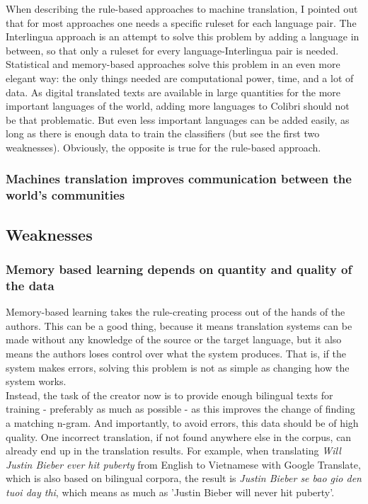 \documentclass[12pt]{article}
\begin{document}
When describing the rule-based approaches to machine translation, I pointed out that for most approaches one needs a specific ruleset for each language pair. The Interlingua approach is an attempt to solve this problem by adding a language in between, so that only a ruleset for every language-Interlingua pair is needed. Statistical and memory-based approaches solve this problem in an even more elegant way: the only things needed are computational power, time, and a lot of data. As digital translated texts are available in large quantities for the more important languages of the world, adding more languages to Colibri should not be that problematic. But even less important languages can be added easily, as long as there is enough data to train the classifiers (but see the first two weaknesses). Obviously, the opposite is true for the rule-based approach.

\subsubsection{Machines translation improves communication between the world's communities}


\subsection{Weaknesses}

\subsubsection{Memory based learning depends on quantity and quality of the data}

Memory-based learning takes the rule-creating process out of the hands of the authors. This can be a good thing, because it means translation systems can be made without any knowledge of the source or the target language, but it also means the authors loses control over what the system produces. That is, if the system makes errors, solving this problem is not as simple as changing how the system works. \\\indent
Instead, the task of the creator now is to provide enough bilingual texts for training - preferably as much as possible - as this improves the change of finding a matching n-gram. And importantly, to avoid errors, this data should be of high quality. One incorrect translation, if not found anywhere else in the corpus, can already end up in the translation results. For example, when translating \emph{Will Justin Bieber ever hit puberty} from English to Vietnamese with Google Translate, which is also based on bilingual corpora, the result is \emph{Justin Bieber se bao gio den tuoi day thi}, which means as much as 'Justin Bieber will never hit puberty'.
\end{document}

